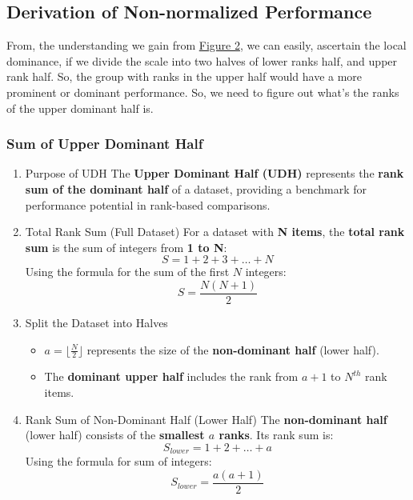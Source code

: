 \documentclass[man,floatsintext]{apa7}
\begin{document}
\subsection*{Derivation of Non-normalized Performance}
From, the understanding we gain from \hyperref[fig:dominance_Understanding]{Figure 2}, we can easily, ascertain the local dominance, if we divide the scale into two halves of lower ranks half, and upper rank half. So, the group with ranks in the upper half would have a more prominent or dominant performance. So, we need to figure out what's the ranks of the upper dominant half is.

\subsubsection{Sum of Upper Dominant Half}
\begin{enumerate}
\item{Purpose of UDH}
The \textbf{Upper Dominant Half (UDH)} represents the \textbf{rank sum of the dominant half} of a dataset, providing a benchmark for performance potential in rank-based comparisons.

\item{Total Rank Sum (Full Dataset)}
For a dataset with \textbf{N items}, the \textbf{total rank sum} is the sum of integers from \textbf{1 to N}:
\begin{equation}
S = 1 + 2 + 3 + \ldots + N
\end{equation}
Using the formula for the sum of the first \( N \) integers:
\begin{equation}
S = \frac{N(N + 1)}{2}
\end{equation}

\item{Split the Dataset into Halves}
\begin{itemize}
  \item \( a = \lfloor \frac{N}{2} \rfloor \) represents the size of the \textbf{non-dominant half} (lower half).
  \item The \textbf{dominant upper half} includes the rank from \( a + 1 \) to \(N^{th}\) rank items.
\end{itemize}



\item{Rank Sum of Non-Dominant Half (Lower Half)}
The \textbf{non-dominant half} (lower half) consists of the \textbf{smallest \( a \) ranks}. Its rank sum is:
\begin{equation}
S_{lower} = 1 + 2 + \ldots + a
\end{equation}
Using the formula for sum of integers:
\begin{equation}
S_{lower} = \frac{a(a+1)}{2}
\end{equation}


\end{enumerate}
\end{document}
